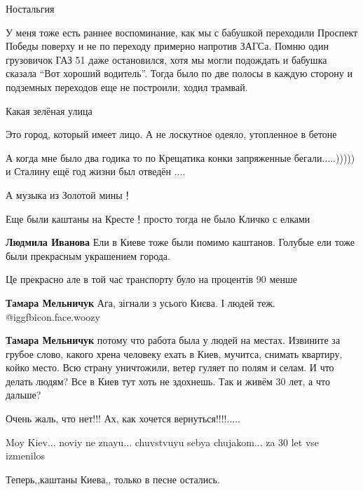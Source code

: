 \begin{itemize}
Ностальгия


У меня тоже есть раннее воспоминание, как мы с бабушкой переходили Проспект
Победы поверху и не по переходу примерно напротив ЗАГСа. Помню один грузовичок
ГАЗ 51 даже остановился, хотя мы могли подождать и бабушка сказала \enquote{Вот хороший
водитель}. Тогда было по две полосы в каждую сторону и подземных переходов еще
не построили, ходил трамвай.


Какая зелёная улица

Это город, который имеет лицо. А не лоскутное одеяло, утопленное в бетоне

А когда мне было два годика то по Крещатика конки запряженные бегали.....)))))
и Сталину ещё год жизни был отведён ....

А музыка из Золотой мины！

Еще были каштаны на Кресте！просто тогда не было Кличко с елками

\begin{itemize} %
\textbf{Людмила Иванова} Ели в Киеве тоже были помимо каштанов. Голубые ели тоже были прекрасным украшением города.
\end{itemize} %

Це прекрасно але в той час транспорту було на процентів 90 менше

\begin{itemize} %
\textbf{Тамара Мельничук} Ага, зігнали з усього Києва. І людей теж.  @igg{fbicon.face.woozy} 

\textbf{Тамара Мельничук} потому что работа была у людей на местах. Извините за грубое слово, какого хрена человеку ехать в Киев, мучитса, снимать квартиру, койко место. Всю страну уничтожили, ветер гуляет по полям и селам. И что делать людям? Все в Киев тут хоть не здохнешь. Так и живём 30 лет, а что дальше?
\end{itemize} %

Очень жаль, что нет!!! Ах, как хочется вернуться!!!!.....

Moy Kiev... noviy ne znayu... chuvstvuyu sebya chujakom... za 30 let vse izmenilos

Теперь,,каштаны Киева,, только в песне остались.


\end{itemize}
